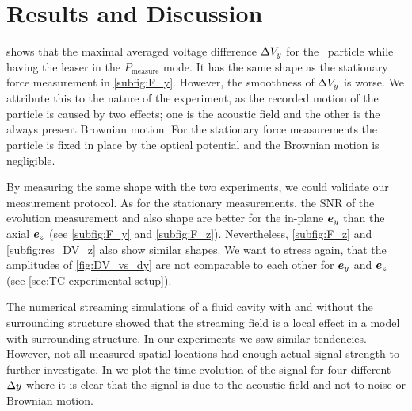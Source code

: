 \section{Results and Discussion\label{sec:TC-results}}

 shows that the maximal averaged voltage difference 
$\Delta V_{y}$ for the \Dtwo~particle while having the leaser in the 
$P_{\text{measure}}$ mode. It has the same shape as the stationary force 
measurement in \cref{subfig:F_y}.  However, the smoothness of $\Delta V_{y}$ is 
worse. We attribute this to the nature of the experiment, as the recorded 
motion of the particle is caused by two effects; one is the acoustic field and 
the other is the always present Brownian motion.  For the stationary force 
measurements the particle is fixed in place by the optical potential and the 
Brownian motion is negligible.

By measuring the same shape with the two experiments, we could validate our 
measurement protocol. As for the stationary measurements, the SNR of the 
evolution measurement and also shape are better for the in-plane $\bm{e}_{y}$ than the 
axial $\bm{e}_{z}$ (see \cref{subfig:F_y} and \cref{subfig:F_z}). Nevertheless, 
\cref{subfig:F_z} and \cref{subfig:res_DV_z} also show similar shapes. We want 
to stress again, that the amplitudes of \cref{fig:DV_vs_dy} are not comparable 
to each other for $\bm{e}_{y}$ and $\bm{e}_{z}$ (see \cref{sec:TC-experimental-setup}).

The numerical streaming simulations of a fluid cavity with and without the
surrounding structure showed that the streaming field is a local effect in a
model with surrounding structure. In our experiments we saw similar tendencies.  
However, not all measured spatial locations had enough actual signal strength 
to further investigate. In  we plot the time evolution 
of the signal for four different $\Delta y$ where it is clear that the signal is due 
to the acoustic field and not to noise or Brownian motion.

